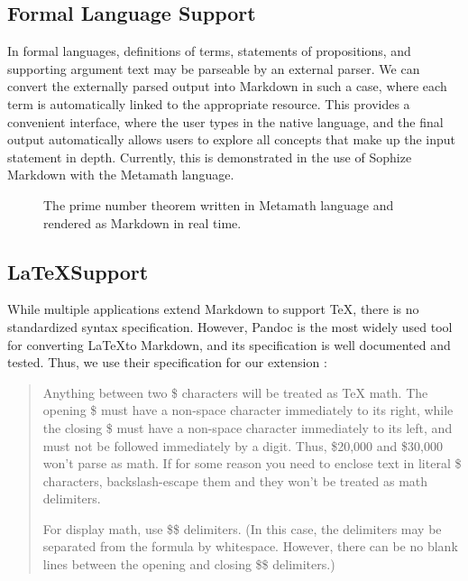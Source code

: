 \documentclass[a4paper]{article}
\begin{document}
\subsection{Formal Language Support}

In formal languages, definitions of terms, statements of propositions, and supporting argument text may be parseable by an external parser. We can convert the externally parsed output into Markdown in such a case, where each term is automatically linked to the appropriate resource. This provides a convenient interface, where the user types in the native language, and the final output automatically allows users to explore all concepts that make up the input statement in depth. Currently, this is demonstrated in the use of Sophize Markdown with the Metamath language.

\begin{figure}[ht]
\begin{center}
\caption{The prime number theorem written in Metamath language and rendered as Markdown in real time.}
\label{formal}
\end{center}
\end{figure}

\subsection{\LaTeX\space Support}

While multiple applications extend Markdown to support TeX, there is no standardized syntax specification. However, Pandoc is the most widely used tool for converting \LaTeX\space to Markdown, and its specification is well documented and tested. Thus, we use their specification for our extension \cite{pandoc}:

\blockquote{Anything between two \$ characters will be treated as TeX math. The opening \$ must have a non-space character immediately to its right, while the closing \$ must have a non-space character immediately to its left, and must not be followed immediately by a digit. Thus, \$20,000 and \$30,000 won’t parse as math. If for some reason you need to enclose text in literal \$ characters, backslash-escape them and they won’t be treated as math delimiters.

For display math, use \$\$ delimiters. (In this case, the delimiters may be separated from the formula by whitespace. However, there can be no blank lines between the opening and closing \$\$ delimiters.)}
\end{document}
